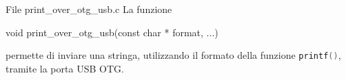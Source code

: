 \begin{frame}[fragile]{File print\_over\_otg\_usb.c}
  La funzione
  \begin{C}
    void print_over_otg_usb(const char * format, ...)
  \end{C}
  permette di inviare una stringa, utilizzando il formato della funzione \lstinline[language=C]!printf()!, tramite la porta USB OTG.
\end{frame}


